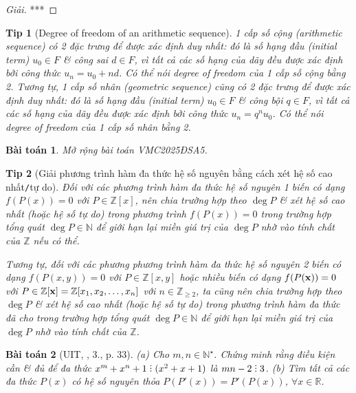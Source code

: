 \documentclass{article}
\newtheorem{baitoan}{Bài toán}
\newtheorem{tip}{Tip}
\DeclareRobustCommand{\divby}{%
	\mathrel{\vbox{\baselineskip.65ex\lineskiplimit0pt\hbox{.}\hbox{.}\hbox{.}}}%
}
\begin{document}
\begin{proof}[Giải]
	***
\end{proof}

\begin{tip}[Degree of freedom of an arithmetic sequence]
	1 cấp số cộng (arithmetic sequence) có 2 đặc trưng để được xác định duy nhất: đó là số hạng đầu (initial term) $u_0\in F$ \& công sai $d\in F$, vì tất cả các số hạng của dãy đều được xác định bởi công thức $u_n = u_0 + nd$. Có thể nói degree of freedom của 1 cấp số cộng bằng 2. Tương tự, 1 cấp số nhân (geometric sequence) cũng có 2 đặc trưng để được xác định duy nhất: đó là số hạng đầu (initial term) $u_0\in F$ \& công bội $q\in F$, vì tất cả các số hạng của dãy đều được xác định bởi công thức $u_n = q^nu_0$. Có thể nói degree of freedom của 1 cấp số nhân bằng 2.
\end{tip}

\begin{baitoan}
	Mở rộng bài toán VMC2025ĐSA5.
\end{baitoan}

\begin{tip}[Giải phương trình hàm đa thức hệ số nguyên bằng cách xét hệ số cao nhất{\tt/}tự do]
	Đối với các phương trình hàm đa thức hệ số nguyên 1 biến có dạng $f(P(x)) = 0$ với $P\in\mathbb{Z}[x]$, nên chia trường hợp theo $\deg P$ \& xét hệ số cao nhất (hoặc hệ số tự do) trong phương trình $f(P(x)) = 0$ trong trường hợp tổng quát $\deg P\in\mathbb{N}$ để giới hạn lại miền giá trị của $\deg P$ nhờ vào tính chất của $\mathbb{Z}$ nếu có thể.
	
	Tương tự, đối với các phương phương trình hàm đa thức hệ số nguyên 2 biến có dạng $f(P(x,y)) = 0$ với $P\in\mathbb{Z}[x,y]$ hoặc nhiều biến có dạng $f(P({\bf x})) = 0$ với $P\in\mathbb{Z}[{\bf x}] = \mathbb{Z}[x_1,x_2,\ldots,x_n]$ với $n\in\mathbb{Z}_{\ge2}$, ta cũng nên chia trường hợp theo $\deg P$ \& xét hệ số cao nhất (hoặc hệ số tự do) trong phương trình hàm đa thức đã cho trong trường hợp tổng quát $\deg P\in\mathbb{N}$ để giới hạn lại miền giá trị của $\deg P$  nhờ vào tính chất của $\mathbb{Z}$.
\end{tip}

\begin{baitoan}[UIT, \cite{VMS_VMC2025}, 3., p. 33]
	(a) Cho $m,n\in\mathbb{N}^\star$. Chứng minh rằng điều kiện cần \& đủ để đa thức $x^m + x^n + 1\divby(x^2 + x + 1)$ là $mn - 2\divby3$. (b) Tìm tất cả các đa  thức $P(x)$ có hệ số nguyên thỏa $P(P'(x)) = P'(P(x))$, $\forall x\in\mathbb{R}$.
\end{baitoan}
\end{document}
